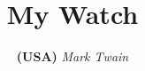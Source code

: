\documentclass{report}
\begin{document}
\title{My Watch}
\author{\textbf{(USA)} \textit{Mark Twain}}
\date{}
\maketitle
\pagestyle{plain}

\end{document}
